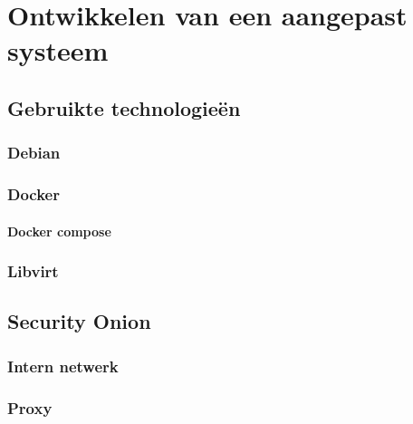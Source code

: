 \documentclass[a4paper,12pt]{report}
\begin{document}

\chapter{Ontwikkelen van een aangepast systeem}
\section{Gebruikte technologie\"en}
\subsection{Debian}
\subsection{Docker}
\subsubsection{Docker compose}
\subsection{Libvirt}

\section{Security Onion}
\subsection{Intern netwerk}
\subsection{Proxy}
\end{document}
